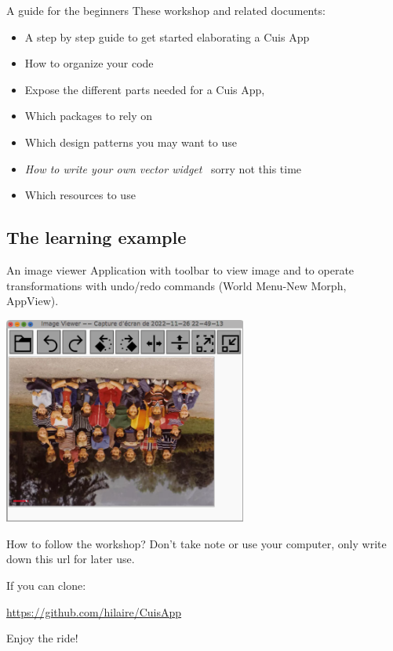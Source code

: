 \documentclass{beamer}
\newcommand{\tip}{\boldmath{\textcolor{red}{$\Rightarrow$}}}
\begin{document}
%
\begin{frame}{A guide for the beginners}
  These workshop and related documents:
  \begin{itemize}
  \item A step by step guide to get started elaborating a Cuis App
  \item How to organize your code
  \item Expose the different parts needed for a Cuis App,
  \item Which packages to rely on
  \item Which design patterns you may want to use
  \item \emph{How to write your own vector widget} \tip\ sorry not this time
  \item Which resources to use
  \end{itemize}
\end{frame}

\subsection{The learning example}
\begin{frame}{An image viewer}
  Application with toolbar to view image and to operate
  transformations with undo/redo commands (World Menu-New Morph, AppView).
\begin{center}
  \includegraphics[width=0.6\textwidth]{CuisApp.png}
\end{center}
\end{frame}
%
\begin{frame}{How to follow the workshop?}
  Don't take note or use your computer, only write down this url for later use.
  \vspace{10pt}
  
  If you can clone:
  \vspace*{2cm}
  \fontsize{16pt}{8pt}\selectfont
  \begin{center}
   \url{https://github.com/hilaire/CuisApp}
  \end{center}
  \fontsize{11pt}{8pt}\selectfont
  \vspace*{2cm}
  \begin{flushright}
   Enjoy the ride!
 \end{flushright}
\end{frame}
\end{document}
